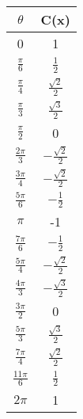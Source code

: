 \documentclass[11pt]{article} %
\begin{document}
\begin{table}
    \begin{tabular}{|c|c|}
    \hline
    $\theta$ & C(x) \\
    \hline
     0   & 1 \\
    $\frac{\pi}{6}$		    & $\frac{1}{2}$  \\
    $\frac{\pi}{4}$ 		    & $\frac{\sqrt{2}}{2}$ \\
    $\frac{\pi}{3}$    	    & $\frac{\sqrt{3}}{2}$  \\
    $\frac{\pi}{2}$   	    & 0 \\
    $\frac{2\pi}{3}$       & $-\frac{\sqrt{2}}{2}$  \\
    $\frac{3\pi}{4}$   	    & $-\frac{\sqrt{2}}{2}$ \\
    $\frac{5\pi}{6}$  	    & $-\frac{1}{2}$  \\
    $\pi$   				 		& -1 \\
    $\frac{7\pi}{6}$       & $-\frac{1}{2}$  \\
    $\frac{5\pi}{4}$       & $-\frac{\sqrt{2}}{2}$  \\
    $\frac{4\pi}{3}$       & $-\frac{\sqrt{3}}{2}$  \\
    $\frac{3\pi}{2}$       & 0 \\
    $\frac{5\pi}{3}$       & $\frac{\sqrt{3}}{2}$  \\
    $\frac{7\pi}{4}$       & $\frac{\sqrt{2}}{2}$  \\
    $\frac{11\pi}{6}$     & $\frac{1}{2}$  \\
    $2\pi$   				    & 1 \\
    \hline
    \end{tabular}
\end{table}
\end{document}
